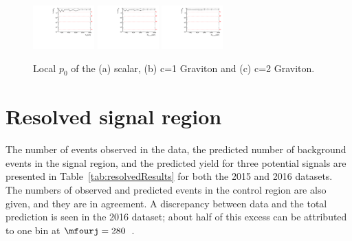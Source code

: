 \begin{figure}[htbp!]
\begin{center}
\includegraphics[width=0.21\textwidth,angle=-90]{figures/boosted/results/p0_s_allmasses_boosted.pdf}
\includegraphics[width=0.21\textwidth,angle=-90]{figures/boosted/results/p0_g10_allmasses_boosted.pdf}
\includegraphics[width=0.21\textwidth,angle=-90]{figures/boosted/results/p0_g20_allmasses_boosted.pdf} 
\caption{Local $p_0$ of the (a) scalar, (b) c=1 Graviton and (c) c=2 Graviton.}
\label{fig:localp0}
\end{center}
\end{figure}


\section{Resolved signal region}
\paragraph{}
The number of events observed in the data, the predicted number of background events in the signal region, and the predicted yield for three potential signals are presented in Table~\ref{tab:resolvedResults} for both the 2015 and 2016 datasets. The numbers of observed and predicted events in the control region are also given, and they are in agreement. A discrepancy between data and the total prediction is seen in the 2016 dataset; about half of this excess can be attributed to one bin at $\mfourj=280$~\GeV.


